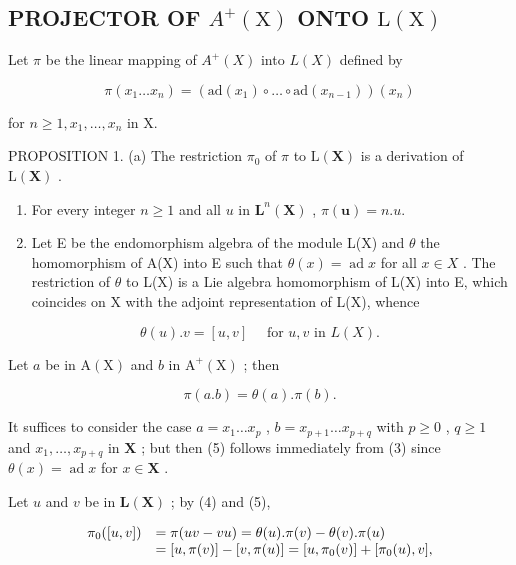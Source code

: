 \subsection{\texorpdfstring{PROJECTOR OF \(A^{+}(\mathrm{X})\) ONTO \(\mathrm{L}(\mathrm{X})\)}{PROJECTOR OF A+ (X) ONTO L(X)}}

Let \(\pi\) be the linear mapping of \(A^{+}(X)\) into \(L(X)\) defined by

\[
\pi (x _ {1} \dots x _ {n}) = (\mathrm{ad} (x _ {1}) \circ \dots \circ \mathrm{ad} (x _ {n - 1})) (x _ {n})\tag{3}
\]

for \(n \geqslant 1, x_1, \ldots, x_n\) in X.

PROPOSITION 1. (a) The restriction \(\pi_0\) of \(\pi\) to \(\mathrm{L}(\mathbf{X})\) is a derivation of \(\mathrm{L}(\mathbf{X})\) .

\begin{enumerate}
\def\labelenumi{(\alph{enumi})}
\setcounter{enumi}{1}
\item
  For every integer \(n \geqslant 1\) and all \(u\) in \(\mathbf{L}^n(\mathbf{X})\) , \(\pi(\mathbf{u}) = n.u.\)
\item
  Let E be the endomorphism algebra of the module L(X) and \(\theta\) the homomorphism of A(X) into E such that \(\theta(x) = \operatorname{ad} x\) for all \(x \in X\) . The restriction of \(\theta\) to L(X) is a Lie algebra homomorphism of L(X) into E, which coincides on X with the adjoint representation of L(X), whence
\end{enumerate}

\[
\theta (u). v = [ u, v ] \quad \text { for   } u, v \text {   in   } L (X).\tag{4}
\]

Let \(a\) be in \(\mathrm{A}(\mathrm{X})\) and \(b\) in \(\mathrm{A}^{+}(\mathrm{X})\) ; then

\[
\pi (a. b) = \theta (a). \pi (b).\tag{5}
\]

It suffices to consider the case \(a = x_{1} \ldots x_{p}\) , \(b = x_{p+1} \ldots x_{p+q}\) with \(p \geqslant 0\) , \(q \geqslant 1\) and \(x_{1}, \ldots, x_{p+q}\) in \(\mathbf{X}\) ; but then (5) follows immediately from (3) since \(\theta(x) = \operatorname{ad} x\) for \(x \in \mathbf{X}\) .

Let \(u\) and \(v\) be in \(\mathbf{L}(\mathbf{X})\) ; by (4) and (5),

\[
\begin{array}{r l} \pi_ {0} ([ u, v ]) & = \pi (u v - v u) = \theta (u). \pi (v) - \theta (v). \pi (u) \\ & = [ u, \pi (v) ] - [ v, \pi (u) ] = [ u, \pi_ {0} (v) ] + [ \pi_ {0} (u), v ], \end{array}
\]

